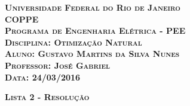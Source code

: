\begin{titlepage}
\begin{flushleft}

\textsc{\textbf{\LARGE Universidade Federal do Rio de Janeiro}}\\[0.5cm]
\textsc{\textbf{\LARGE COPPE}}\\[0.5cm]
\textsc{\textbf{\LARGE Programa de Engenharia Elétrica - PEE}}\\[0.5cm]
\textsc{\textbf{\LARGE Disciplina: Otimização Natural}}\\[0.5cm]
\textsc{\textbf{\LARGE Aluno: Gustavo Martins da Silva Nunes}}\\[0.5cm]
\textsc{\textbf{\LARGE Professor: José Gabriel}}\\[0.5cm]
\textsc{\textbf{\LARGE Data: 24/03/2016}}\\[6.5cm]

\end{flushleft}
\begin{center}
\textsc{\textbf{\huge Lista 2 - Resolução}}
\vfill
\end{center}
\end{titlepage}